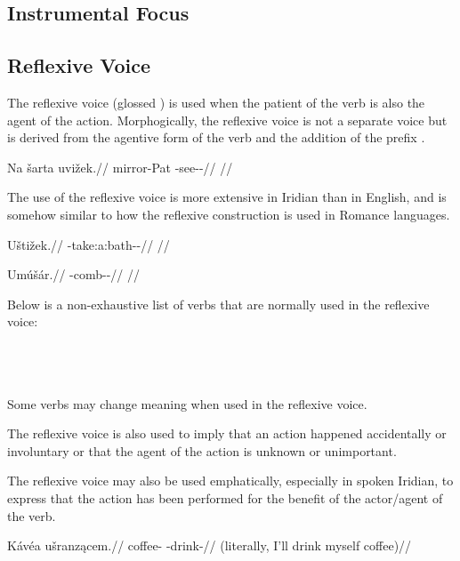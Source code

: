 \subsection{Instrumental Focus}


\subsection{Reflexive Voice}

The reflexive voice (glossed {\Refl}) is used when the patient of the verb is also the agent of the action. Morphogically, the reflexive voice is not a separate voice but is derived from the agentive form of the verb and the addition of the prefix .

\pex
\begingl
\gla Na šarta uvižek.//
\glb \Loc{} mirror-Pat{} \Refl{}-see-\Av{}-\Pf{}//
\glft {}//
\endgl
\xe

The use of the reflexive voice is more extensive in Iridian than in English, and is somehow similar to how the reflexive construction is used in Romance languages.

\pex
\begingl
\gla Uštižek.//
\glb \Refl{}-take:a:bath-\Av{}-\Pf{}//
\glft {}//
\endgl
\xe

\pex
\begingl
\gla Umúš\'ar.//
\glb \Refl{}-comb-\Av{}-\Prog{}//
\glft {}//
\endgl
\xe

Below is a non-exhaustive list of verbs that are normally used in the reflexive voice:
\bigskip

\noindent
{} \\
 \\
 \\

Some verbs may change meaning when used in the reflexive voice.


The reflexive voice is also used to imply that an action happened accidentally or involuntary or that the agent of the action is unknown or unimportant.

The reflexive voice may also be used emphatically, especially in spoken Iridian, to express that the action has been performed for the benefit of the actor/agent of the verb.

\pex
\begingl
\gla Kávéa ušranz\k{a}cem.//
\glb coffee- -drink-//
\glft {} (literally, I'll drink myself coffee)//
\endgl
\xe

